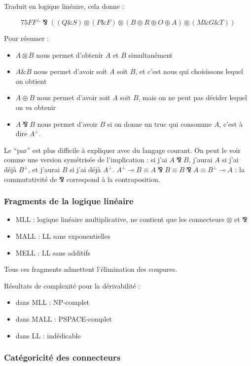 \documentclass[a4paper, 11pt]{article}
\newcommand{\avec}{\mathbin{\&}}
\newcommand{\parr}{\mathbin{⅋}}
\begin{document}
Traduit en logique linéaire, cela donne :

$$75 FF^{\bot} \parr ((Q \avec S) \otimes (P \avec F) \otimes (B \oplus R \oplus O \oplus A) \otimes (M \avec G \avec T))$$ 

Pour résumer :
\begin{itemize}
    \item $A \otimes B$ nous permet d'obtenir $A$ et $B$ simultanément
    \item $A \avec B$ nous permet d'avoir soit $A$ soit $B$, et c'est nous qui choisissons lequel on obtient
    \item $A \oplus B$ nous permet d'avoir soit $A$ soit $B$, mais on ne peut pas décider lequel on va obtenir
    \item $A \parr B$ nous permet d'avoir $B$ si on donne un truc qui consomme $A$, c'est à dire $A^{\bot}$.
\end{itemize}

Le \enquote{par} est plus difficile à expliquer avec du langage courant. On peut le voir comme une version symétrisée de l'implication : si j'ai $A \parr B$, j'aurai $A$ si j'ai déjà $B^\perp$, et j'aurai $B$ si j'ai déjà $A^\perp$. $A^\perp \multimap B \equiv A \parr B \equiv B \parr A \equiv B^\perp \multimap A$ : la commutativité de $\parr$ correspond à la contraposition.

\subsubsection{Fragments de la logique linéaire}

\begin{itemize}
\item MLL : logique linéaire multiplicative, ne contient que les connecteurs $\otimes$ et $\parr$
\item MALL : LL sans exponentielles
\item MELL : LL sans additifs
\end{itemize}
Tous ces fragments admettent l'élimination des coupures.

Résultats de complexité pour la dérivabilité :
\begin{itemize}
\item dans MLL : NP-complet
\item dans MALL : PSPACE-complet
\item dans LL : indédicable
\end{itemize}

\subsubsection{Catégoricité des connecteurs}
\end{document}
